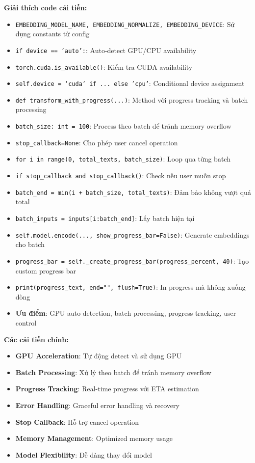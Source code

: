 \textbf{Giải thích code cải tiến:}
\begin{itemize}
    \item \texttt{EMBEDDING\_MODEL\_NAME, EMBEDDING\_NORMALIZE, EMBEDDING\_DEVICE}: Sử dụng constants từ config
    \item \texttt{if device == 'auto':}: Auto-detect GPU/CPU availability
    \item \texttt{torch.cuda.is\_available()}: Kiểm tra CUDA availability
    \item \texttt{self.device = 'cuda' if ... else 'cpu'}: Conditional device assignment
    \item \texttt{def transform\_with\_progress(...)}: Method với progress tracking và batch processing
    \item \texttt{batch\_size: int = 100}: Process theo batch để tránh memory overflow
    \item \texttt{stop\_callback=None}: Cho phép user cancel operation
    \item \texttt{for i in range(0, total\_texts, batch\_size)}: Loop qua từng batch
    \item \texttt{if stop\_callback and stop\_callback()}: Check nếu user muốn stop
    \item \texttt{batch\_end = min(i + batch\_size, total\_texts)}: Đảm bảo không vượt quá total
    \item \texttt{batch\_inputs = inputs[i:batch\_end]}: Lấy batch hiện tại
    \item \texttt{self.model.encode(..., show\_progress\_bar=False)}: Generate embeddings cho batch
    \item \texttt{progress\_bar = self.\_create\_progress\_bar(progress\_percent, 40)}: Tạo custom progress bar
    \item \texttt{print(progress\_text, end="", flush=True)}: In progress mà không xuống dòng
    \item \textbf{Ưu điểm}: GPU auto-detection, batch processing, progress tracking, user control
\end{itemize}

\textbf{Các cải tiến chính:}
\begin{itemize}
    \item \textbf{GPU Acceleration}: Tự động detect và sử dụng GPU
    \item \textbf{Batch Processing}: Xử lý theo batch để tránh memory overflow
    \item \textbf{Progress Tracking}: Real-time progress với ETA estimation
    \item \textbf{Error Handling}: Graceful error handling và recovery
    \item \textbf{Stop Callback}: Hỗ trợ cancel operation
    \item \textbf{Memory Management}: Optimized memory usage
    \item \textbf{Model Flexibility}: Dễ dàng thay đổi model
\end{itemize}

